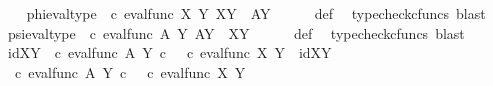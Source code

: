 \begin{isabellebody}
\ \ \isamarkupfalse%
\ phi{\isacharunderscore}{\kern0pt}eval{\isacharunderscore}{\kern0pt}type{\isacharcolon}{\kern0pt}\ {\isachardoublequoteopen}{\isacharparenleft}{\kern0pt}{\isasymphi}\ {\isasymcirc}\isactrlsub c\ eval{\isacharunderscore}{\kern0pt}func\ X\ Y{\isacharparenright}{\kern0pt}\isactrlsup {\isasymsharp}{\isacharcolon}{\kern0pt}\ X\isactrlbsup Y\isactrlesup \ {\isasymrightarrow}\ A\isactrlbsup Y\isactrlesup {\isachardoublequoteclose}\isanewline
\ \ \ \ \isamarkupfalse%
\ {\isasymphi}{\isacharunderscore}{\kern0pt}def\ \isamarkupfalse%
\ {\isacharparenleft}{\kern0pt}typecheck{\isacharunderscore}{\kern0pt}cfuncs{\isacharcomma}{\kern0pt}\ blast{\isacharparenright}{\kern0pt}\isanewline
\ \ \isamarkupfalse%
\ psi{\isacharunderscore}{\kern0pt}eval{\isacharunderscore}{\kern0pt}type{\isacharcolon}{\kern0pt}\ {\isachardoublequoteopen}{\isacharparenleft}{\kern0pt}{\isasympsi}\ {\isasymcirc}\isactrlsub c\ eval{\isacharunderscore}{\kern0pt}func\ A\ Y{\isacharparenright}{\kern0pt}\isactrlsup {\isasymsharp}{\isacharcolon}{\kern0pt}\ A\isactrlbsup Y\isactrlesup \ {\isasymrightarrow}\ X\isactrlbsup Y\isactrlesup {\isachardoublequoteclose}\isanewline
\ \ \ \ \isamarkupfalse%
\ {\isasympsi}{\isacharunderscore}{\kern0pt}def\ \isamarkupfalse%
\ {\isacharparenleft}{\kern0pt}typecheck{\isacharunderscore}{\kern0pt}cfuncs{\isacharcomma}{\kern0pt}\ blast{\isacharparenright}{\kern0pt}\isanewline
\isanewline
\ \ \isamarkupfalse%
\ idXY{\isacharcolon}{\kern0pt}\ {\isachardoublequoteopen}{\isacharparenleft}{\kern0pt}{\isasympsi}\ {\isasymcirc}\isactrlsub c\ eval{\isacharunderscore}{\kern0pt}func\ A\ Y{\isacharparenright}{\kern0pt}\isactrlsup {\isasymsharp}\ {\isasymcirc}\isactrlsub c\ \ {\isacharparenleft}{\kern0pt}{\isasymphi}\ {\isasymcirc}\isactrlsub c\ eval{\isacharunderscore}{\kern0pt}func\ X\ Y{\isacharparenright}{\kern0pt}\isactrlsup {\isasymsharp}\ {\isacharequal}{\kern0pt}\ id{\isacharparenleft}{\kern0pt}X\isactrlbsup Y\isactrlesup {\isacharparenright}{\kern0pt}{\isachardoublequoteclose}\isanewline
\ \ \isamarkupfalse%
\ {\isacharminus}{\kern0pt}\ \isanewline
\ \ \ \ \isamarkupfalse%
\ {\isachardoublequoteopen}{\isacharparenleft}{\kern0pt}{\isasympsi}\ {\isasymcirc}\isactrlsub c\ eval{\isacharunderscore}{\kern0pt}func\ A\ Y{\isacharparenright}{\kern0pt}\isactrlsup {\isasymsharp}\ {\isasymcirc}\isactrlsub c\ \ {\isacharparenleft}{\kern0pt}{\isasymphi}\ {\isasymcirc}\isactrlsub c\ eval{\isacharunderscore}{\kern0pt}func\ X\ Y{\isacharparenright}{\kern0pt}\isactrlsup {\isasymsharp}\ {\isacharequal}{\kern0pt}\ \isanewline

\end{isabellebody}
